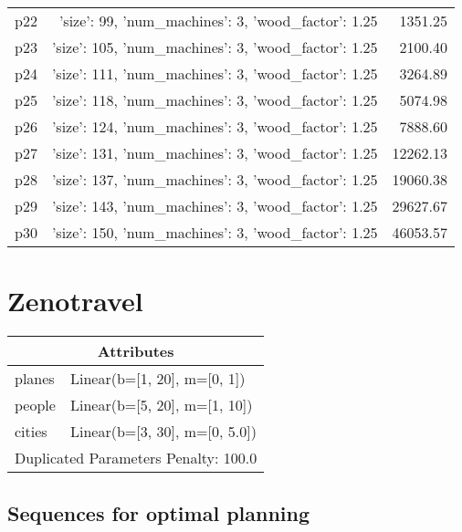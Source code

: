 \documentclass{article}
\begin{document}
\begin{center}
\begin{tabular}{@{}l|r|r@{}}
  p22&{'size': 99, 'num\_machines': 3, 'wood\_factor': 1.25}&1351.25\\
  p23&{'size': 105, 'num\_machines': 3, 'wood\_factor': 1.25}&2100.40\\
  p24&{'size': 111, 'num\_machines': 3, 'wood\_factor': 1.25}&3264.89\\
  p25&{'size': 118, 'num\_machines': 3, 'wood\_factor': 1.25}&5074.98\\
  p26&{'size': 124, 'num\_machines': 3, 'wood\_factor': 1.25}&7888.60\\
  p27&{'size': 131, 'num\_machines': 3, 'wood\_factor': 1.25}&12262.13\\
  p28&{'size': 137, 'num\_machines': 3, 'wood\_factor': 1.25}&19060.38\\
  p29&{'size': 143, 'num\_machines': 3, 'wood\_factor': 1.25}&29627.67\\
  p30&{'size': 150, 'num\_machines': 3, 'wood\_factor': 1.25}&46053.57
                            \end{tabular}
                            \end{center}
                    
                            \newpage \section{Zenotravel}
                    \begin{center}
                    \begin{tabular}{@{}p{}p{}@{}}
                    \multicolumn{2}{c}{\bf \large Attributes}\\\midrule
                    planes & Linear(b=[1, 20], m=[0, 1])\\
people & Linear(b=[5, 20], m=[1, 10])\\
cities & Linear(b=[3, 30], m=[0, 5.0]) \\\midrule
                    \multicolumn{2}{l}{Duplicated Parameters Penalty: 100.0}
                    \end{tabular}
                    \end{center}
                
                            \subsection*{Sequences for optimal planning}
\end{document}
